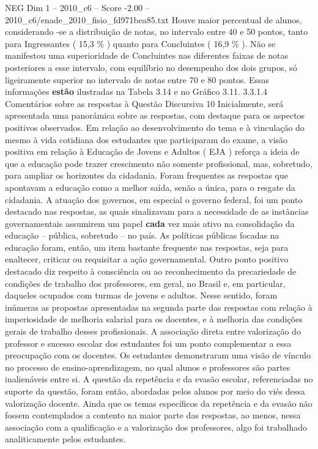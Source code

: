 \begin{textsample}{NEG Dim 1 – 2010\_c6 – Score -2.00 – 2010\_c6/enade\_2010\_fisio\_fd971bea85.txt}
Houve maior percentual de alunos, considerando -se a distribuição de notas, no intervalo entre 40 e 50 pontos, tanto para Ingressantes ( 15,3 \% ) quanto para Concluintes ( 16,9 \% ).
Não se manifestou uma superioridade de Concluintes nas diferentes faixas de notas posteriores a esse intervalo, com equilíbrio no desempenho dos dois grupos, só ligeiramente superior no intervalo de notas entre 70 e 80 pontos.
Essas informações \textbf{estão} ilustradas na Tabela 3.14 e no Gráfico 3.11. 3.3.1.4 Comentários sobre as respostas à Questão Discursiva 10 Inicialmente, será apresentada uma panorâmica sobre as respostas, com destaque para os aspectos positivos observados.
Em relação ao desenvolvimento do tema e à vinculação do mesmo à vida cotidiana dos estudantes que participaram do exame, a visão positiva em relação à Educação de Jovens e Adultos ( EJA ) reforça a ideia de que a educação pode trazer crescimento não somente profissional, mas, sobretudo, para ampliar os horizontes da cidadania.
Foram frequentes as respostas que apontavam a educação como a melhor saída, senão a única, para o resgate da cidadania.
A atuação dos governos, em especial o governo federal, foi um ponto destacado nas respostas, as quais sinalizavam para a necessidade de as instâncias governamentais assumirem um papel \textbf{cada} vez mais ativo na consolidação da educação – pública, sobretudo – no país.
As políticas públicas focadas na educação foram, então, um item bastante frequente nas respostas, seja para enaltecer, criticar ou requisitar a ação governamental.
Outro ponto positivo destacado diz respeito à consciência ou ao reconhecimento da precariedade de condições de trabalho dos professores, em geral, no Brasil e, em particular, daqueles ocupados com turmas de jovens e adultos.
Nesse sentido, foram inúmeras as propostas apresentadas na segunda parte das respostas com relação à imperiosidade de melhoria salarial para os docentes, e à melhoria das condições gerais de trabalho desses profissionais.
A associação direta entre valorização do professor e sucesso escolar dos estudantes foi um ponto complementar a essa preocupação com os docentes.
Os estudantes demonstraram uma visão de vínculo no processo de ensino-aprendizagem, no qual alunos e professores são partes inalienáveis entre si.
A questão da repetência e da evasão escolar, referenciadas no suporte da questão, foram então, abordadas pelos alunos por meio do viés dessa valorização docente.
Ainda que os temas específicos da repetência e da evasão não fossem contemplados a contento na maior parte das respostas, ao menos, nessa associação com a qualificação e a valorização dos professores, algo foi trabalhado analiticamente pelos estudantes.

\end{textsample}
